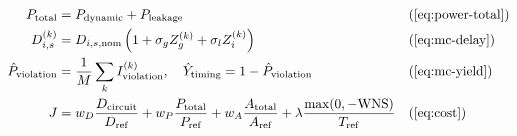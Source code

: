 \begin{appendices}
\begin{align*}
    P_{\mathrm{total}} &= P_{\mathrm{dynamic}} + P_{\mathrm{leakage}} & &\text{(\cref{eq:power-total})}\\
    D^{(k)}_{i,s} &= D_{i,s,\mathrm{nom}}\left(1+\sigma_g Z_g^{(k)} + \sigma_l Z_i^{(k)}\right) & &\text{(\cref{eq:mc-delay})}\\
    \hat P_{\mathrm{violation}} &= \frac1M\sum_k I^{(k)}_{\mathrm{violation}}, \quad \hat Y_{\mathrm{timing}} = 1-\hat P_{\mathrm{violation}} & &\text{(\cref{eq:mc-yield})}\\
    J &= w_D\frac{D_{\mathrm{circuit}}}{D_{\mathrm{ref}}} + w_P\frac{P_{\mathrm{total}}}{P_{\mathrm{ref}}} + w_A\frac{A_{\mathrm{total}}}{A_{\mathrm{ref}}} + \lambda\frac{\max(0,-\mathrm{WNS})}{T_{\mathrm{ref}}} & &\text{(\cref{eq:cost})}
\end{align*}



\end{appendices}

